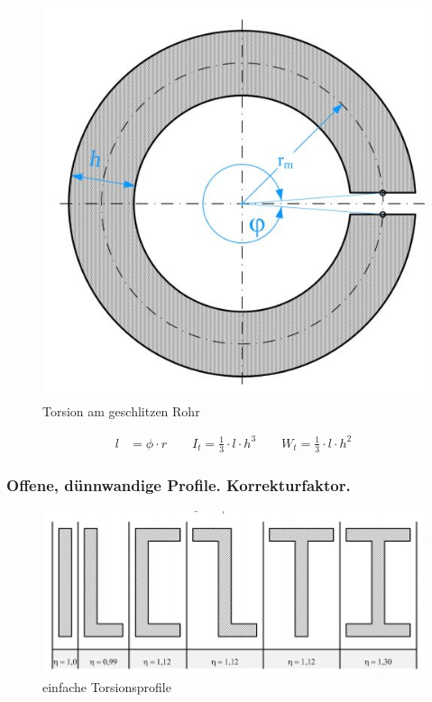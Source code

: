 \begin{figure}[h]
	\centering
	\includegraphics[scale=0.6]{Torsion_4.jpg}
	\caption{Torsion am geschlitzen Rohr}
\end{figure}


\begin{align*}
l &= \phi \cdot r \qquad
I_t = \frac{1}{3} \cdot l \cdot h^3 \qquad
W_t = \frac{1}{3} \cdot l \cdot h^2
\end{align*}

\newpage

\subsubsection*{Offene, dünnwandige Profile. Korrekturfaktor.}


\begin{figure}[h]
	\centering
	\includegraphics[scale=0.6]{Torsion_5.jpg}
	\caption{einfache Torsionsprofile}
\end{figure}

